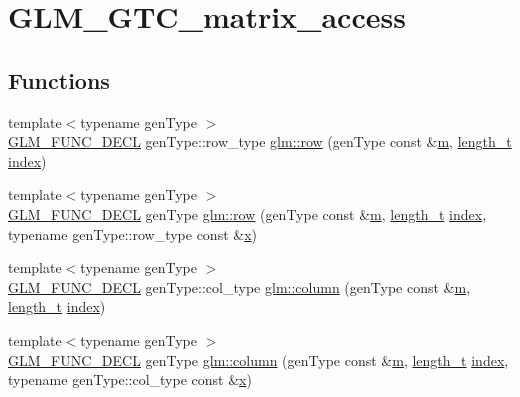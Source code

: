 \hypertarget{group__gtc__matrix__access}{}\section{G\+L\+M\+\_\+\+G\+T\+C\+\_\+matrix\+\_\+access}
\label{group__gtc__matrix__access}
\subsection*{Functions}
\begin{DoxyCompactItemize}
\item 
{\footnotesize template$<$typename gen\+Type $>$ }\\\hyperlink{setup_8hpp_ab2d052de21a70539923e9bcbf6e83a51}{G\+L\+M\+\_\+\+F\+U\+N\+C\+\_\+\+D\+E\+CL} gen\+Type\+::row\+\_\+type \hyperlink{group__gtc__matrix__access_ga259e5ebd0f31ec3f83440f8cae7f5dba}{glm\+::row} (gen\+Type const \&\hyperlink{_s_d_l__opengl__glext_8h_af593500c283bf1a787a6f947f503a5c2}{m}, \hyperlink{namespaceglm_a090a0de2260835bee80e71a702492ed9}{length\+\_\+t} \hyperlink{_s_d_l__opengl__glext_8h_a57f14e05b1900f16a2da82ade47d0c6d}{index})
\item 
{\footnotesize template$<$typename gen\+Type $>$ }\\\hyperlink{setup_8hpp_ab2d052de21a70539923e9bcbf6e83a51}{G\+L\+M\+\_\+\+F\+U\+N\+C\+\_\+\+D\+E\+CL} gen\+Type \hyperlink{group__gtc__matrix__access_gaadcc64829aadf4103477679e48c7594f}{glm\+::row} (gen\+Type const \&\hyperlink{_s_d_l__opengl__glext_8h_af593500c283bf1a787a6f947f503a5c2}{m}, \hyperlink{namespaceglm_a090a0de2260835bee80e71a702492ed9}{length\+\_\+t} \hyperlink{_s_d_l__opengl__glext_8h_a57f14e05b1900f16a2da82ade47d0c6d}{index}, typename gen\+Type\+::row\+\_\+type const \&\hyperlink{_s_d_l__opengl_8h_ad0e63d0edcdbd3d79554076bf309fd47}{x})
\item 
{\footnotesize template$<$typename gen\+Type $>$ }\\\hyperlink{setup_8hpp_ab2d052de21a70539923e9bcbf6e83a51}{G\+L\+M\+\_\+\+F\+U\+N\+C\+\_\+\+D\+E\+CL} gen\+Type\+::col\+\_\+type \hyperlink{group__gtc__matrix__access_ga96022eb0d3fae39d89fc7a954e59b374}{glm\+::column} (gen\+Type const \&\hyperlink{_s_d_l__opengl__glext_8h_af593500c283bf1a787a6f947f503a5c2}{m}, \hyperlink{namespaceglm_a090a0de2260835bee80e71a702492ed9}{length\+\_\+t} \hyperlink{_s_d_l__opengl__glext_8h_a57f14e05b1900f16a2da82ade47d0c6d}{index})
\item 
{\footnotesize template$<$typename gen\+Type $>$ }\\\hyperlink{setup_8hpp_ab2d052de21a70539923e9bcbf6e83a51}{G\+L\+M\+\_\+\+F\+U\+N\+C\+\_\+\+D\+E\+CL} gen\+Type \hyperlink{group__gtc__matrix__access_ga9e757377523890e8b80c5843dbe4dd15}{glm\+::column} (gen\+Type const \&\hyperlink{_s_d_l__opengl__glext_8h_af593500c283bf1a787a6f947f503a5c2}{m}, \hyperlink{namespaceglm_a090a0de2260835bee80e71a702492ed9}{length\+\_\+t} \hyperlink{_s_d_l__opengl__glext_8h_a57f14e05b1900f16a2da82ade47d0c6d}{index}, typename gen\+Type\+::col\+\_\+type const \&\hyperlink{_s_d_l__opengl_8h_ad0e63d0edcdbd3d79554076bf309fd47}{x})
\end{DoxyCompactItemize}


